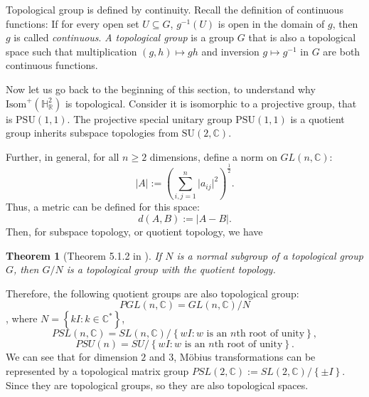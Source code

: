 \documentclass[12pt,oneside]{sfsuthesis}
\theoremstyle{plain} %
\newtheorem{theorem}{Theorem}[chapter]
\theoremstyle{definition}  %
\theoremstyle{remark}  %
\theoremstyle{plain}
\begin{document}
{Topological group is defined by continuity. Recall the definition of continuous functions: If for every open set $U\subseteq G$, $g^{-1}(U)$ is open in the domain of $g$, then $g$ is called \textit{continuous}. \textit{A topological group} is a group $G$ that is also a topological space such that multiplication $(g,h)\mapsto gh$ and inversion $g\mapsto g^{-1}$ in $G$ are both continuous functions. 

Now let us go back to the beginning of this section, to understand why $\text{Isom}^+(\mathbb{H}^2_\mathbb{R})$ is topological. Consider it is isomorphic to a projective group, that is $\text{PSU}(1,1)$. The projective special unitary group $\text{PSU}(1,1)$ is a quotient group inherits subspace topologies from $\text{SU}(2,\mathbb{C})$.%

Further, in general, for all $n\geq 2$ dimensions, define a norm on $GL(n,\mathbb{C})$:
$$
\left\vert A \right\vert := \left( \sum\limits_{i,j=1}^n \vert a_{ij}\vert^2 \right)^{\frac{1}{2}}.
$$
Thus, a metric can be defined for this space: $$
d(A,B):=\vert A -B \vert.
$$
Then, for subspace topology, or quotient topology, we have
\begin{theorem}[Theorem 5.1.2 in \cite{ratcliffe1994foundations}]
If $N$ is a normal subgroup of a topological group $G$, then $G/N$ is a topological group with the quotient topology.
\end{theorem}
Therefore, the following quotient groups are also topological group: $$PGL(n, \mathbb{C})=GL(n,\mathbb{C})/N$$, where $N=\left\lbrace kI: k\in\mathbb{C}^{\ast}\right\rbrace$, $$PSL(n, \mathbb{C})=SL(n,\mathbb{C})/\left\lbrace wI: w\text{ is an }n\text{th root of unity}\right\rbrace,$$ $$PSU(n)=SU/\left\lbrace wI: w\text{ is an }n\text{th root of unity}\right\rbrace.$$ We can see that for dimension $2$ and $3$, M\"{o}bius transformations can be represented by a topological matrix group $
PSL(2,\mathbb{C}):=SL(2,\mathbb{C})/\left\lbrace \pm I\right\rbrace.$ Since they are topological groups, so they are also topological spaces.

}
\end{document}
